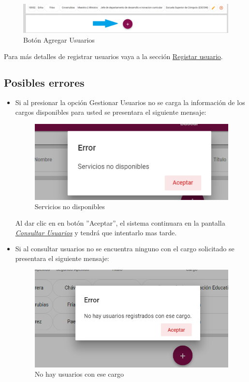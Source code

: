             \begin{figure}[!hbtp]
                \centering
                \hypertarget{add}{\includegraphics[width=0.7\linewidth]{images/SP5/BtnAgregar}}
                \caption{Botón Agregar Usuarios}
                \label{add}
            \end{figure}
    
            Para más detalles de registrar usuarios vaya a la sección \hyperref[registrarUs]{Registar usuario}.
            
        \subsection{Posibles errores}
    	  \begin{itemize}	
            	\item Si al  presionar la opción Gestionar Usuarios no se carga la información de los cargos disponibles para usted se presentara el siguiente mensaje:
            
             \begin{figure}[!hbtp]
            	\centering
            	\includegraphics[width=0.4\linewidth]{images/SP5/MSGSN}
            	\caption{Servicios no disponibles}
            	\label{SND}
            	
            \end{figure}
            
            		Al dar clic en en botón ''Aceptar'', el sistema continuara en la pantalla  \hyperlink{consultarUs}{\textit{Consultar Usuarios}} y tendrá que intentarlo  mas tarde.
            
           		\item Si al consultar usuarios no se encuentra ninguno con el cargo solicitado se presentara el siguiente mensaje:
           		 \begin{figure}[!hbtp]
           			\centering
           			\includegraphics[width=0.4\linewidth]{images/SP5/MSG21}
           			\caption{No hay usuarios con ese cargo}
           			\label{mensaje21}
           		\end{figure}
           
           \end{itemize} 
            
